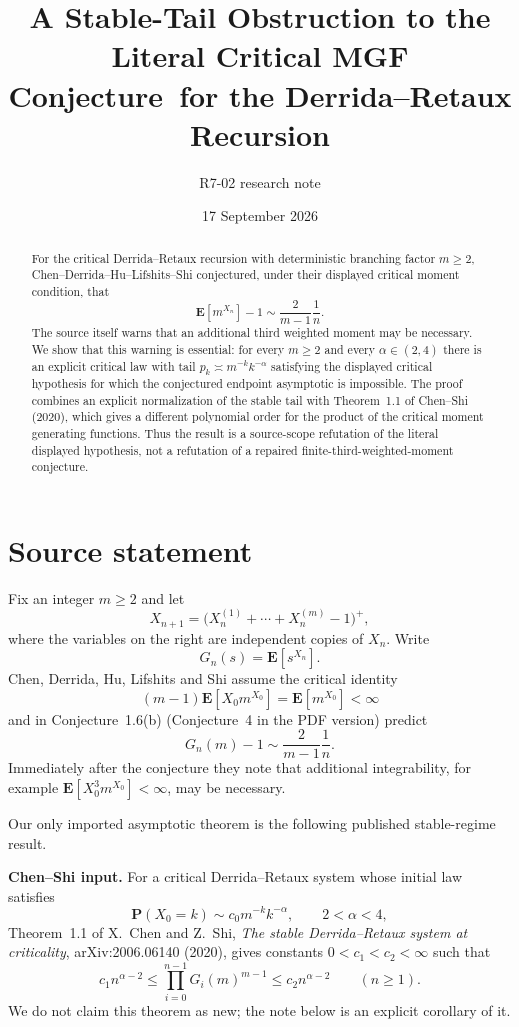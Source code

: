 \documentclass[11pt]{article}
\title{A Stable-Tail Obstruction to the Literal Critical MGF Conjecture\
for the Derrida--Retaux Recursion}
\author{R7-02 research note}
\date{17 September 2026}
\begin{document}
\maketitle

\begin{abstract}
For the critical Derrida--Retaux recursion with deterministic branching factor $m\ge2$, Chen--Derrida--Hu--Lifshits--Shi conjectured, under their displayed critical moment condition, that
\[
\mathbf E[m^{X_n}]-1\sim \frac{2}{m-1}\frac1n.
\]
The source itself warns that an additional third weighted moment may be necessary.  We show that this warning is essential: for every $m\ge2$ and every $\alpha\in(2,4)$ there is an explicit critical law with tail $p_k\asymp m^{-k}k^{-\alpha}$ satisfying the displayed critical hypothesis for which the conjectured endpoint asymptotic is impossible.  The proof combines an explicit normalization of the stable tail with Theorem~1.1 of Chen--Shi (2020), which gives a different polynomial order for the product of the critical moment generating functions.  Thus the result is a source-scope refutation of the literal displayed hypothesis, not a refutation of a repaired finite-third-weighted-moment conjecture.
\end{abstract}

\section{Source statement}
Fix an integer $m\ge2$ and let
\[
X_{n+1}=\bigl(X_n^{(1)}+\cdots+X_n^{(m)}-1\bigr)^+,
\]
where the variables on the right are independent copies of $X_n$.  Write
\[
G_n(s)=\mathbf E[s^{X_n}].
\]
Chen, Derrida, Hu, Lifshits and Shi assume the critical identity
\begin{equation}
(m-1)\mathbf E[X_0m^{X_0}]=\mathbf E[m^{X_0}]<\infty
\tag{C}
\end{equation}
and in Conjecture~1.6(b) (Conjecture~4 in the PDF version) predict
\begin{equation}
G_n(m)-1\sim \frac{2}{m-1}\frac1n.
\tag{E}
\end{equation}
Immediately after the conjecture they note that additional integrability, for example
$\mathbf E[X_0^3m^{X_0}]<\infty$, may be necessary.

Our only imported asymptotic theorem is the following published stable-regime result.

\medskip
\noindent\textbf{Chen--Shi input.}
For a critical Derrida--Retaux system whose initial law satisfies
\[
\mathbf P(X_0=k)\sim c_0m^{-k}k^{-\alpha},\qquad 2<\alpha<4,
\]
Theorem~1.1 of X.~Chen and Z.~Shi, \emph{The stable Derrida--Retaux system at criticality}, arXiv:2006.06140 (2020), gives constants $0<c_1<c_2<\infty$ such that
\begin{equation}
c_1n^{\alpha-2}
\le
\prod_{i=0}^{n-1}G_i(m)^{m-1}
\le
c_2n^{\alpha-2}
\qquad(n\ge1).
\tag{CS}
\end{equation}
We do not claim this theorem as new; the note below is an explicit corollary of it.
\end{document}

